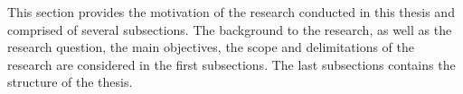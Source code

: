 %
%
This section provides the motivation of the research conducted in this thesis and comprised of 
several subsections.
%
The background to the research, as well as the research question, the main objectives, the scope 
and delimitations of the research are considered in the first subsections.
%
The last subsections contains the structure of the thesis.